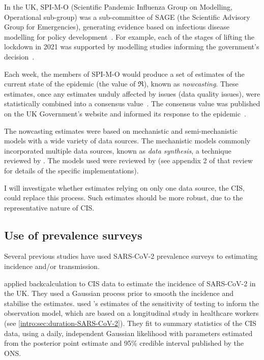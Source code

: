 \documentclass[thesis.tex]{subfiles}
\begin{document}
In the UK, SPI-M-O (Scientific Pandemic Influenza Group on Modelling, Operational sub-group) was a sub-committee of SAGE (the Scientific Advisory Group for Emergencies), generating evidence based on infectious disease modelling for policy development~\autocite{medleySPIM,govSPIMO}.
For example, each of the stages of lifting the lockdown in 2021 was supported by  modelling studies informing the government's decision~\autocite{sageEvidence}.

Each week, the members of SPI-M-O would produce a set of estimates of the current state of the epidemic (\eg the value of $\Re$), known as \emph{nowcasting}.
These estimates, once any estimates unduly affected by issues (\eg data quality issues), were statistically combined into a consensus value~\autocite{parkCombining}.
The consensus value was published on the UK Government's website and informed its response to the epidemic~\autocite{govRnumber}.

The nowcasting estimates were based on mechanistic and semi-mechanistic models with a wide variety of data sources.
The mechanistic models commonly incorporated multiple data sources, known as \emph{data synthesis}, a technique reviewed by \textcite{birrellEvidence}.
The models used were reviewed by \textcite{royalSocietyRnumber} (see appendix 2 of that review for details of the specific implementations).

I will investigate whether estimates relying on only one data source, the CIS, could replace this process.
Such estimates should be more robust, due to the representative nature of CIS.


\subsection{Use of prevalence surveys}

Several previous studies have used SARS-CoV-2 prevalence surveys to estimating incidence and/or transmission.

\Textcite{abbottCISincidence} applied backcalculation to CIS data to estimate the incidence of SARS-CoV-2 in the UK.
They used a Gaussian process prior to smooth the incidence and stabilise the estimates.
\Textcite{abbottCISincidence} used \textcite{hellewellPCRSensitivity}'s estimates of the sensitivity of testing to inform the observation model, which are based on a longitudinal study in healthcare workers (see \cref{intro:sec:duration-SARS-CoV-2}).
They fit to summary statistics of the CIS data, using a daily, independent Gaussian likelihood with parameters estimated from the posterior point estimate and 95\% credible interval published by the ONS.
\end{document}
